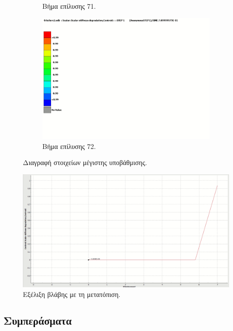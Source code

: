 \documentclass{article}
\begin{document}
\begin{figure}[H]
\begin{subfigure}{0.3\linewidth}
        \caption{Βήμα επίλυσης 71.}
        \label{fig:label2}
    \end{subfigure}
    \hfill
    \begin{subfigure}{0.3\linewidth}
        \centering
        \includegraphics[width=\linewidth]{media/sdeg3.png}
        \caption{Βήμα επίλυσης 72.}
        \label{fig:label3}
    \end{subfigure}
    \caption{Διαγραφή στοιχείων μέγιστης υποβάθμισης.}
    \label{fig:steps}
\end{figure}

\begin{figure}[H]
    \centering
    \includegraphics[width=0.7\linewidth]{media/sdeg-u.png}
    \caption{Εξέλιξη βλάβης με τη μετατόπιση.}
    \label{fig:sdegu}
\end{figure}


\subsection{Συμπεράσματα}











\listoffigures
\listoftables

\nocite{*}
\printbibliography
\end{document}
